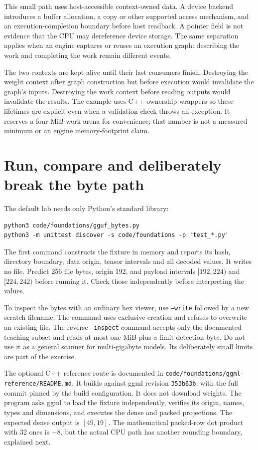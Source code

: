This small path uses host-accessible context-owned data. A device
backend introduces a buffer allocation, a copy or other supported
access mechanism, and an execution-completion boundary before host
readback. A pointer field is not evidence that the CPU may
dereference device storage. The same separation applies when an
engine captures or reuses an execution graph: describing the work
and completing the work remain different events.

The two contexts are kept alive until their last consumers finish.
Destroying the weight context after graph construction but before
execution would invalidate the graph's inputs. Destroying the work
context before reading outputs would invalidate the results.
The example uses C++ ownership wrappers so these lifetimes are
explicit even when a validation check throws an exception.
It reserves a four-MiB work arena for convenience; that number
is not a measured minimum or an engine memory-footprint claim.

\section{Run, compare and deliberately break the byte path}
The default lab needs only Python's standard library:
\begin{verbatim}
python3 code/foundations/gguf_bytes.py
python3 -m unittest discover -s code/foundations -p 'test_*.py'
\end{verbatim}
The first command constructs the fixture in memory and reports its
hash, directory boundary, data origin, tensor intervals and all
decoded values. It writes no file. Predict 256 file bytes, origin
192, and payload intervals $[192,224)$ and $[224,242)$ before
running it. Check those independently before interpreting the values.

To inspect the bytes with an ordinary hex viewer, use
\texttt{--write} followed by a new scratch filename. The command
uses exclusive creation and refuses to overwrite an existing file.
The reverse \texttt{--inspect} command accepts only the documented
teaching subset and reads at most one MiB plus a limit-detection
byte. Do not use it as a general scanner for multi-gigabyte models.
Its deliberately small limits are part of the exercise.

The optional C++ reference route is documented in
\texttt{code/foundations/ggml-reference/README.md}. It builds against
ggml revision \texttt{353b63b}, with the full commit pinned by the
build configuration. It does not download weights. The program
asks ggml to load the fixture independently, verifies its origin,
names, types and dimensions, and executes the dense and packed
projections. The expected dense output is $[49,19]$. The mathematical
packed-row dot product with 32 ones is $-8$, but the actual CPU
path has another rounding boundary, explained next.

